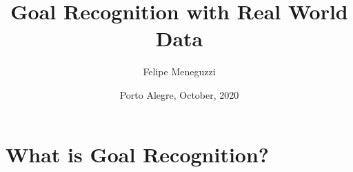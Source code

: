 \documentclass[usenames,dvipsnames]{beamer}
\title[\fontsize{0.08cm}{1em}\selectfont Goal Recognition with Real World Data]{Goal Recognition with Real World Data}
\author[Meneguzzi]{Felipe Meneguzzi\dag
}
\institute[]{\dag Pontifical Catholic University of Rio Grande do Sul, Brazil
\\
\url{felipe.meneguzzi@pucrs.br}
}
\date{Porto Alegre, October, 2020}
\begin{document}

    \begin{frame}
        \titlepage
    \end{frame}
	\logo{}
    
\section{What is Goal Recognition?}

\end{document}
